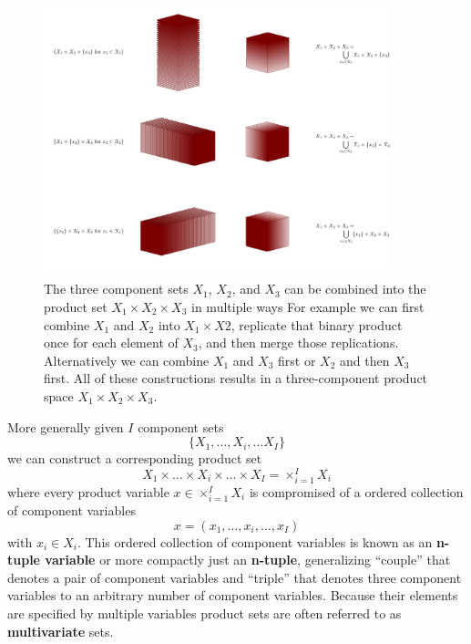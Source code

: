 \documentclass[
  letterpaper,
  DIV=11,
  numbers=noendperiod]{scrartcl}
\begin{document}
\begin{figure}

{\centering \includegraphics[width=0.9\textwidth,height=\textheight]{figures/general_product/3d_all/3d_all.pdf}

}

\caption{\label{fig-general-product3d}The three component sets
\(X_{1}\), \(X_{2}\), and \(X_{3}\) can be combined into the product set
\(X_{1} \times X_{2} \times X_{3}\) in multiple ways For example we can
first combine \(X_{1}\) and \(X_{2}\) into \(X_{1} \times X{2}\),
replicate that binary product once for each element of \(X_{3}\), and
then merge those replications. Alternatively we can combine \(X_{1}\)
and \(X_{3}\) first or \(X_{2}\) and then \(X_{3}\) first. All of these
constructions results in a three-component product space
\(X_{1} \times X_{2} \times X_{3}\).}

\end{figure}

More generally given \(I\) component sets \[
\{ X_{1}, \ldots, X_{i}, \ldots X_{I} \}
\] we can construct a corresponding product set \[
X_{1} \times \ldots \times X_{i} \times \ldots \times X_{I}
=
\times_{i = 1}^{I} X_{i}
\] where every product variable \(x \in \times_{i = 1}^{I} X_{i}\) is
compromised of a ordered collection of component variables \[
x = ( x_{1}, \ldots, x_{i}, \ldots, x_{I})
\] with \(x_{i} \in X_{i}\). This ordered collection of component
variables is known as an \textbf{n-tuple variable} or more compactly
just an \textbf{n-tuple}, generalizing ``couple'' that denotes a pair of
component variables and ``triple'' that denotes three component
variables to an arbitrary number of component variables. Because their
elements are specified by multiple variables product sets are often
referred to as \textbf{multivariate} sets.
\end{document}
